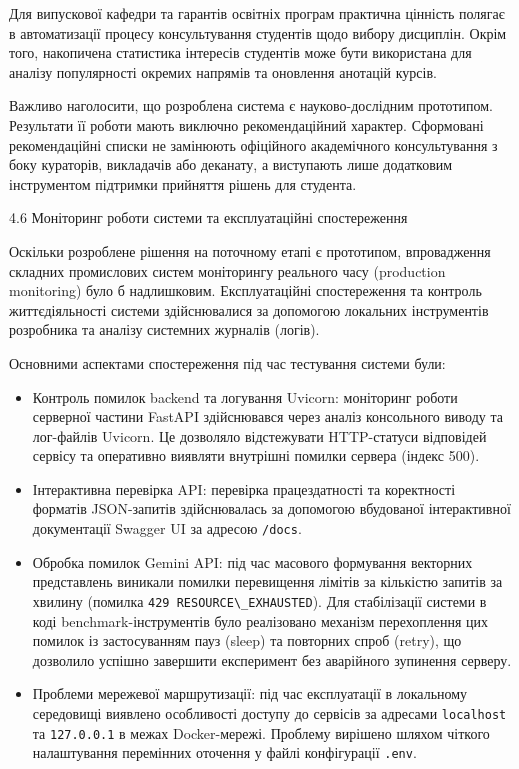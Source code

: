 \documentclass[
]{article}
\newcommand{\passthrough}[1]{#1}
\begin{document}
Для випускової кафедри та гарантів освітніх програм практична цінність
полягає в автоматизації процесу консультування студентів щодо вибору
дисциплін. Окрім того, накопичена статистика інтересів студентів може
бути використана для аналізу популярності окремих напрямів та оновлення
анотацій курсів.

Важливо наголосити, що розроблена система є науково-дослідним
прототипом. Результати її роботи мають виключно рекомендаційний
характер. Сформовані рекомендаційні списки не замінюють офіційного
академічного консультування з боку кураторів, викладачів або деканату, а
виступають лише додатковим інструментом підтримки прийняття рішень для
студента.

\protect{}\label{Xddcc2d41e218d4eab0104affeeaeb116ef3d72e}{}4.6
Моніторинг роботи системи та експлуатаційні спостереження

Оскільки розроблене рішення на поточному етапі є прототипом,
впровадження складних промислових систем моніторингу реального часу
(production monitoring) було б надлишковим. Експлуатаційні спостереження
та контроль життєдіяльності системи здійснювалися за допомогою локальних
інструментів розробника та аналізу системних журналів (логів).

Основними аспектами спостереження під час тестування системи були:

\begin{itemize}
\item
  Контроль помилок backend та логування Uvicorn: моніторинг роботи
  серверної частини FastAPI здійснювався через аналіз консольного виводу
  та лог-файлів Uvicorn. Це дозволяло відстежувати HTTP-статуси
  відповідей сервісу та оперативно виявляти внутрішні помилки сервера
  (індекс 500).
\item
  Інтерактивна перевірка API: перевірка працездатності та коректності
  форматів JSON-запитів здійснювалась за допомогою вбудованої
  інтерактивної документації Swagger UI за адресою
  \passthrough{\lstinline!/!}\passthrough{\lstinline!docs!}.
\item
  Обробка помилок Gemini API: під час масового формування векторних
  представлень виникали помилки перевищення лімітів за кількістю запитів
  за хвилину (помилка
  \passthrough{\lstinline!429 RESOURCE\_EXHAUSTED!}). Для стабілізації
  системи в коді benchmark-інструментів було реалізовано механізм
  перехоплення цих помилок із застосуванням пауз (sleep) та повторних
  спроб (retry), що дозволило успішно завершити експеримент без
  аварійного зупинення серверу.
\item
  Проблеми мережевої маршрутизації: під час експлуатації в локальному
  середовищі виявлено особливості доступу до сервісів за адресами
  \passthrough{\lstinline!localhost!} та
  \passthrough{\lstinline!127.0.0.1!} в межах Docker-мережі. Проблему
  вирішено шляхом чіткого налаштування перемінних оточення у файлі
  конфігурації \passthrough{\lstinline!.!}\passthrough{\lstinline!env!}.
\end{itemize}
\end{document}
